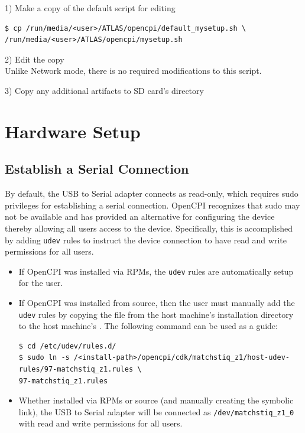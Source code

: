 \begin{flushleft}
1) Make a copy of the default script for editing\medskip
\begin{verbatim}
$ cp /run/media/<user>/ATLAS/opencpi/default_mysetup.sh \
/run/media/<user>/ATLAS/opencpi/mysetup.sh
\end{verbatim}\medskip

2) Edit the copy\\ \medskip
Unlike Network mode, there is no required modifications to this script. \medskip

3) Copy any additional artifacts to SD card's  directory \medskip


\end{flushleft}

\pagebreak
\section{Hardware Setup}

\subsection{Establish a Serial Connection}
By default, the USB to Serial adapter connects as read-only, which requires sudo privileges for establishing a serial connection. OpenCPI recognizes that sudo may not be available and has provided an alternative for configuring the device thereby allowing all users access to the device. Specifically, this is accomplished by adding \texttt{udev} rules to instruct the device connection to have read and write permissions for all users.
\begin{itemize}
\item If OpenCPI was installed via RPMs, the \texttt{udev} rules are automatically setup for the user.
\item If OpenCPI was installed from source, then the user must manually add the \texttt{udev} rules by copying the file from the host machine's installation directory to the host machine's . The following command can be used as a guide:
\begin{verbatim}
$ cd /etc/udev/rules.d/
$ sudo ln -s /<install-path>/opencpi/cdk/matchstiq_z1/host-udev-rules/97-matchstiq_z1.rules \
97-matchstiq_z1.rules
\end{verbatim}
\item Whether installed via RPMs or source (and manually creating the symbolic link), the USB to Serial adapter will be connected as \texttt{/dev/matchstiq\_z1\_0} with read and write permissions for all users.
\end{itemize}

